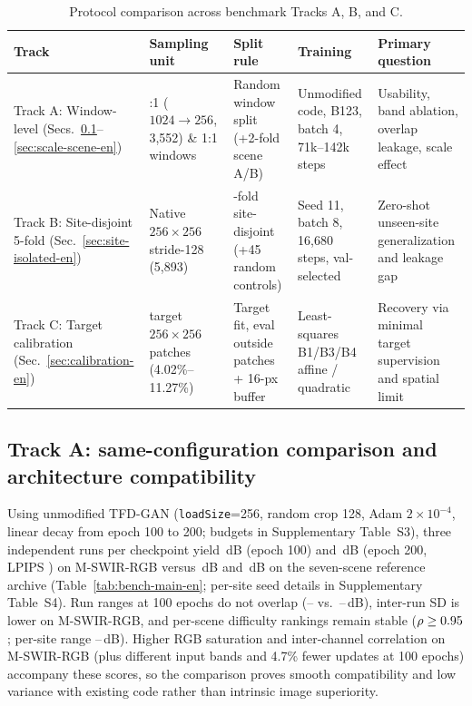 \documentclass[a4paper,10pt]{article}
\begin{document}
\begin{table}[htbp]\centering\small
\caption{Protocol comparison across benchmark Tracks A, B, and C.}\label{tab:bench-tracks-en}
\begin{tabularx}{\textwidth}{@{}>{\raggedright\arraybackslash}p{}>{\raggedright\arraybackslash}p{}>{\raggedright\arraybackslash}p{}>{\raggedright\arraybackslash}p{}>{\raggedright\arraybackslash}X@{}}
\toprule
Track & Sampling unit & Split rule & Training & Primary question\\
\midrule
Track A: Window-level (Secs.~\ref{sec:same-config-en}--\ref{sec:scale-scene-en}) & 4:1 ($1024\to256$, 3,552) \& 1:1 windows & Random window split (+2-fold scene A/B) & Unmodified code, B123, batch 4, 71k--142k steps & Usability, band ablation, overlap leakage, scale effect\\
Track B: Site-disjoint 5-fold (Sec.~\ref{sec:site-isolated-en}) & Native $256\times256$ stride-128 (5,893) & 5-fold site-disjoint (+45 random controls) & Seed 11, batch 8, 16,680 steps, val-selected & Zero-shot unseen-site generalization and leakage gap\\
Track C: Target calibration (Sec.~\ref{sec:calibration-en}) & 10 target $256\times256$ patches (4.02\%--11.27\%) & Target fit, eval outside patches + 16-px buffer & Least-squares B1/B3/B4 affine / quadratic & Recovery via minimal target supervision and spatial limit\\
\bottomrule
\end{tabularx}
\end{table}

\subsection{Track A: same-configuration comparison and architecture compatibility}\label{sec:same-config-en}
Using unmodified TFD-GAN (\texttt{loadSize}=256, random crop 128, Adam $2\times10^{-4}$, linear decay from epoch 100 to 200; budgets in Supplementary Table~S3), three independent runs per checkpoint yield \MsEpHundredPsnrPm\,dB (epoch 100) and \MsEpTwoHundredPsnrPm\,dB (epoch 200, LPIPS \MsEpTwoHundredLpips) on M-SWIR-RGB versus \ChEpHundredPsnrPm\,dB and \ChEpTwoHundredPsnrPm\,dB on the seven-scene reference archive (Table~\ref{tab:bench-main-en}; per-site seed details in Supplementary Table~S4). Run ranges at 100 epochs do not overlap (\MsEpHundredRunMin--\MsEpHundredRunMax{} vs.\ \ChEpHundredRunMin--\ChEpHundredRunMax\,dB), inter-run SD is lower on M-SWIR-RGB, and per-scene difficulty rankings remain stable ($\rho \ge 0.95$; per-site range \MsSceneMinPsnr--\MsSceneMaxPsnr\,dB). Higher RGB saturation and inter-channel correlation on M-SWIR-RGB (plus different input bands and 4.7\% fewer updates at 100 epochs) accompany these scores, so the comparison proves smooth compatibility and low variance with existing code rather than intrinsic image superiority.
\end{document}

